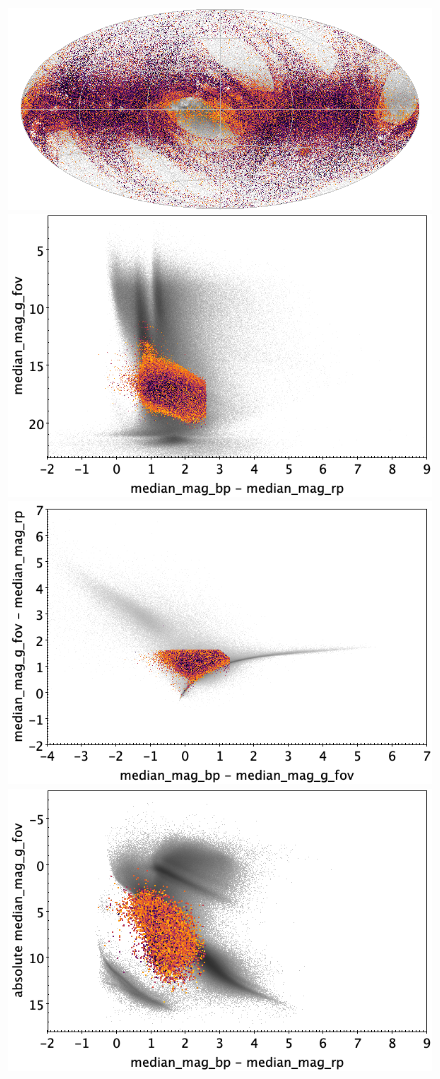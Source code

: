 \documentclass[longauth]{aa}
\begin{document}
\begin{appendix}
\begin{figure}
\centering
{}
\includegraphics[width=0.6\hsize]{figures/appendix/S_cls_sky.png} 
 \\ %
\vspace{4mm}
 \includegraphics[width=0.45\hsize]{figures/appendix/S_cls_cm.png}  %
\hspace{2mm}
 \includegraphics[width=0.45\hsize]{figures/appendix/S_cls_cc.png} \\ %
\vspace{4mm}
 \includegraphics[width=0.45\hsize]{figures/appendix/S_cls_cam.png}  %

\end{figure}
\end{appendix}
\end{document}
